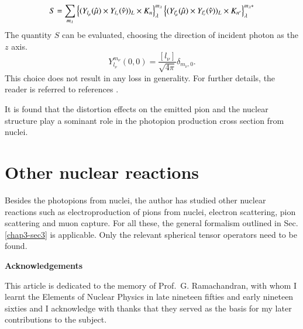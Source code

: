 \begin{equation}
  S= \sum_{m_\lambda} \left\{ (Y_{l_\mu} (\hat{\mu}) \times Y_{l_\nu} (\hat{\nu}))_L \times {\boldmath K}_n\right\}_\lambda^{m_\lambda} \left\{(Y_{l'_\mu} (\hat{\mu}) \times Y_{l_\nu'}(\hat{\nu}))_L \times {\boldmath K}_{n'} \right\}_{\lambda}^{m_\lambda\ast} \label{chap3-eq60}
\end{equation}
The quantity $S$ can be evaluated, choosing the direction of incident photon as the $z$ axis.
$$
Y_{l_\nu}^{m_\nu} (0, 0) = \frac{[l_\nu]}{\sqrt{4\pi}}\delta_{m_\nu, 0}.
$$
This choice does not result in any loss in generality. For further details, the reader is referred to references \cite{chap3-key20, chap3-key21}.

It is found that the distortion effects on the emitted pion and the nuclear structure play a sominant role \cite{chap3-key21} in the photopion production cross section from nuclei.

\section{Other nuclear reactions}\label{chap3-sec6}

Besides the photopions from nuclei, the author has studied other nuclear reactions such as electroproduction of pions from nuclei, electron scattering, pion scattering and muon capture. For all these, the general formalism outlined in Sec.\ref{chap3-sec3} is applicable. Only the relevant spherical tensor operators need to be found.

\medskip
\noindent \textbf{\large Acknowledgements}
\medskip

This article is dedicated to the memory of Prof.\ G. Ramachandran, with whom I learnt the Elements of Nuclear Physics in late nineteen fifties and early nineteen sixties and I acknowledge with thanks that they served as the basis for my later contributions to the subject.


